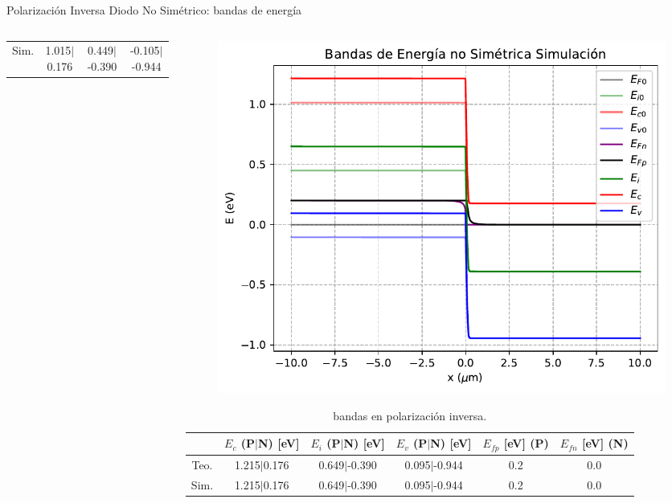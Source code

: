 \documentclass[aspectratio=169,xcolor=dvipsnames]{beamer}
\begin{document}
\begin{frame}{Polarización Inversa Diodo No Simétrico: bandas de energía}
\begin{columns}
\begin{column}{0.45\textwidth}
\begin{table}
\begin{tabular}{c|ccc}
                \tiny{Sim.} & \tiny{1.015$|$0.176} & \tiny{0.449$|$-0.390} &  \tiny{-0.105$|$-0.944} 
            \end{tabular}
        \end{table}
    \end{column}
    \begin{column}{0.45\textwidth}
        \vspace{-0.45cm}
        \begin{figure} \centering
            \includegraphics[width=1\linewidth]{Inversa/Bandas_Energia-Inversa.pdf}
        \end{figure}
        \vspace{-0.6cm}
        \begin{table}
            \caption{bandas en polarización inversa.}
            \vspace{-0.7cm}
            \begin{tabular}{c|ccccc}
                & \tiny{$E_c$ (P$|$N)} \tiny{[eV]} & \tiny{$E_i$ (P$|$N)} \tiny{[eV]} & \tiny{$E_v$ (P$|$N)} \tiny{[eV]}  & \tiny{$E_{fp}$ [eV]} (P) & \tiny{$E_{fn}$ [eV]} (N) \\ \hline
    
                \tiny{Teo.} & \tiny{1.215$|$0.176} & \tiny{0.649$|$-0.390} & \tiny{0.095$|$-0.944} & \tiny{0.2} & \tiny{0.0} \\

                \tiny{Sim.} & \tiny{1.215$|$0.176} & \tiny{0.649$|$-0.390} & \tiny{0.095$|$-0.944} & \tiny{0.2} & \tiny{0.0} \\
            \end{tabular}
        \end{table}
    \end{column}
    \hspace{2.3cm}
    \end{columns}
\end{frame}
\end{document}
